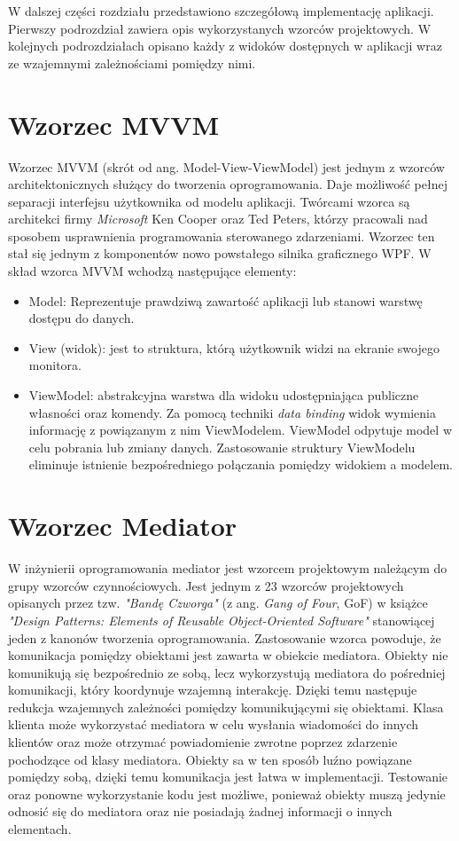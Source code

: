 W dalszej części rozdziału przedstawiono szczegółową implementację aplikacji. Pierwszy podrozdział zawiera opis wykorzystanych wzorców projektowych. W kolejnych podrozdziałach opisano każdy z widoków dostępnych w aplikacji wraz ze wzajemnymi zależnościami pomiędzy nimi.

\section{Wzorzec MVVM}
Wzorzec MVVM (skrót od ang. Model-View-ViewModel) jest jednym z wzorców architektonicznych służący do tworzenia oprogramowania. Daje możliwość pełnej separacji interfejsu użytkownika od modelu aplikacji. Twórcami wzorca są architekci firmy \textit{Microsoft} Ken Cooper oraz Ted Peters, którzy pracowali nad sposobem usprawnienia programowania sterowanego zdarzeniami. Wzorzec ten stał się jednym z komponentów nowo powstałego silnika graficznego WPF. 
W skład wzorca MVVM wchodzą następujące elementy:
\begin{itemize}
	\item Model: Reprezentuje prawdziwą zawartość aplikacji lub stanowi warstwę dostępu do danych.
	\item View (widok): jest to struktura, którą użytkownik widzi na ekranie swojego monitora.
	\item ViewModel: abstrakcyjna warstwa dla widoku udostępniająca publiczne własności oraz komendy. Za pomocą techniki \textit{data binding} widok wymienia informację z powiązanym z nim ViewModelem. ViewModel odpytuje model w celu pobrania lub zmiany danych. Zastosowanie struktury ViewModelu eliminuje istnienie bezpośredniego połączania pomiędzy widokiem a modelem.
\end{itemize}

\section{Wzorzec Mediator}
\label{sec: mediator}
W inżynierii oprogramowania mediator jest wzorcem projektowym należącym do grupy wzorców czynnościowych. Jest jednym z 23 wzorców projektowych opisanych przez tzw. \textit{"Bandę Czworga"} (z ang. \textit{Gang of Four}, GoF) w książce \textit{"Design Patterns: Elements of Reusable Object-Oriented Software"} stanowiącej jeden z kanonów tworzenia oprogramowania. Zastosowanie wzorca powoduje, że komunikacja pomiędzy obiektami jest zawarta w obiekcie mediatora. Obiekty nie komunikują się bezpośrednio ze sobą, lecz wykorzystują mediatora do pośredniej komunikacji, który koordynuje wzajemną interakcję.  Dzięki temu następuje redukcja wzajemnych zależności pomiędzy komunikującymi się obiektami. Klasa klienta może wykorzystać mediatora w celu wysłania wiadomości do innych klientów oraz może otrzymać powiadomienie zwrotne poprzez zdarzenie pochodzące od klasy mediatora. Obiekty sa w ten sposób luźno powiązane pomiędzy sobą, dzięki temu komunikacja jest łatwa w implementacji. Testowanie oraz ponowne wykorzystanie kodu jest możliwe, ponieważ obiekty muszą jedynie odnosić się do mediatora oraz nie posiadają żadnej informacji o innych elementach.

